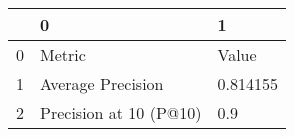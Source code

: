 \begin{tabular}{lll}
\toprule
{} &                       0 &         1 \\
\midrule
0 &                  Metric &     Value \\
1 &       Average Precision &  0.814155 \\
2 &  Precision at 10 (P@10) &       0.9 \\
\bottomrule
\end{tabular}
